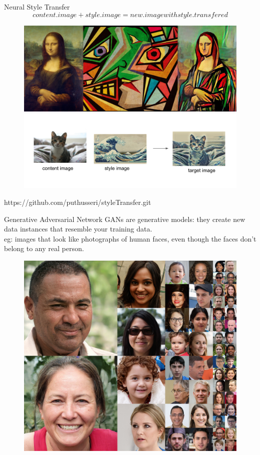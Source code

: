 \documentclass[10pt]{beamer}
\begin{document}
\begin{frame}[fragile]{Neural Style Transfer}
    \begin{equation}
        content.image + style.image =  new.image with style.transfered
    \end{equation}
    \begin{figure}[ht]
      \hspace*{-1cm}\includegraphics[width=0.5\linewidth]{styletransfer} \\
      \hspace*{-1cm}\includegraphics[width=0.7\linewidth]{styletransfercat} 
    \end{figure}
    https://github.com/puthusseri/styleTransfer.git
\end{frame}





\begin{frame}[fragile]{Generative Adversarial Network}
 GANs are generative models: they create new data instances that resemble your training data. \\
 eg: images that look like photographs of human faces, even though the faces don't belong to any real person.
     \begin{figure}[ht]
      \hspace*{-1cm}\includegraphics[width=0.5\linewidth]{ganhumans} 

    \end{figure}
\end{frame}
\end{document}
